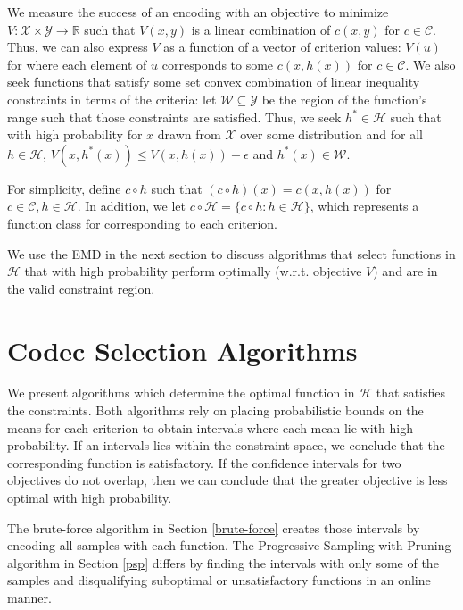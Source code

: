 \documentclass{article}
\newcommand{\cc}[1]{\textcolor{blue}{Cyrus: \textbf{#1}}}
\begin{document}
{We measure the success of an encoding with an objective to minimize $V: \mathcal{X} \times \mathcal{Y} \rightarrow \mathbb{R}$ such that $V(x, y)$ is a linear combination of $c(x, y)$ for $c \in \mathcal{C}$. Thus, we can also express $V$ as a function of a vector of criterion values: $V(u)$ for where each element of $u$ corresponds to some $c(x, h(x))$ for $c \in \mathcal{C}$. We also seek functions that satisfy some set convex combination of linear inequality constraints in terms of the criteria: let $\mathcal{W} \subseteq \mathcal{Y}$ be the region of the function's range such that those constraints are satisfied. Thus, we seek $h^* \in \mathcal{H}$ such that with high probability for $x$ drawn from $\mathcal{X}$ over some distribution and for all $h \in \mathcal{H}$, $V(x, h^*(x)) \leq V(x,h(x)) + \epsilon$ and $h^*(x) \in \mathcal{W}$.

For simplicity, define $c \circ h$ such that $(c \circ h)(x) = c(x,h(x))$ for $c \in \mathcal{C}, h \in \mathcal{H}$. In addition, we let $c \circ \mathcal{H} = \{c \circ h : h \in \mathcal{H}\}$, which represents a function class for corresponding to each criterion.


We use the EMD in the next section to discuss algorithms that select functions in $\mathcal{H}$ that with high probability perform optimally (w.r.t. objective $V$) and are in the valid constraint region.

\section{Codec Selection Algorithms}

We present algorithms which determine the optimal function in $\mathcal{H}$ that satisfies the constraints. Both algorithms rely on placing probabilistic bounds on the means for each criterion to obtain intervals where each mean lie with high probability. If an intervals lies within the constraint space, we conclude that the corresponding function is satisfactory. If the confidence intervals for two objectives do not overlap, then we can conclude that the greater objective is less optimal with high probability. 

The brute-force algorithm in Section \ref{brute-force} creates those intervals by encoding all samples with each function. The Progressive Sampling with Pruning algorithm in Section \ref{psp} differs by finding the intervals with only some of the samples and disqualifying suboptimal or unsatisfactory functions in an online manner.

}
\end{document}
